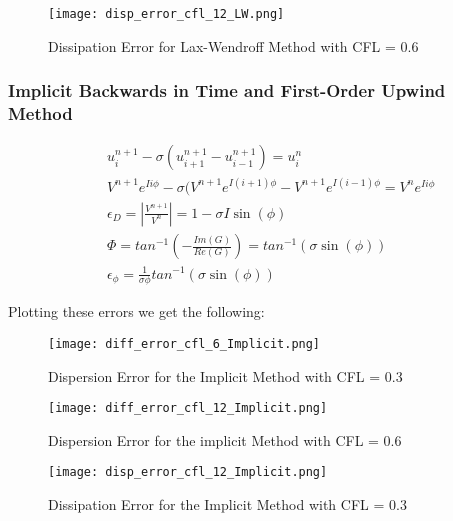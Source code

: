 \documentclass[a4paper,12pt,titlepage]{article}
\newcommand{\scale}{0.5}
\begin{document}
\begin{figure}[H]
  \begin{center}
    \texttt{[image: disp\_error\_cfl\_12\_LW.png]}
    \caption{Dissipation Error for Lax-Wendroff Method with CFL = 0.6}
  \end{center}
\end{figure}



\subsubsection{Implicit Backwards in Time and First-Order Upwind Method}
\begin{eqnarray}
&&u_{i}^{n+1} - \sigma(u_{i+1}^{n+1}-u_{i-1}^{n+1}) = u_i^n\nonumber \\
&&V^{n+1}e^{Ii\phi} - \sigma(V^{n+1}e^{I(i+1)\phi}-V^{n+1}e^{I(i-1)\phi} = V^{n}e^{Ii\phi}\nonumber \\
&&\boxed{\epsilon_D = \left|\frac{V^{n+1}}{V^n} \right| = 1-\sigma I \sin(\phi)}\nonumber \\
&&\Phi = tan^{-1}\left(-\frac{Im(G)}{Re(G)} \right) = tan^{-1}\left(\sigma \sin(\phi) \right)\nonumber \\
&&\boxed{\epsilon_\phi = \frac{1}{\sigma \phi}tan^{-1}\left(\sigma \sin(\phi) \right)}
\end{eqnarray}

Plotting these errors we get the following:

\begin{figure}[H]
  \begin{center}
    \texttt{[image: diff\_error\_cfl\_6\_Implicit.png]}
    \caption{Dispersion Error for the Implicit Method with CFL = 0.3}
  \end{center}
\end{figure}

\begin{figure}[H]
  \begin{center}
    \texttt{[image: diff\_error\_cfl\_12\_Implicit.png]}
    \caption{Dispersion Error for the implicit Method with CFL = 0.6}
  \end{center}
\end{figure}

\begin{figure}[H]
  \begin{center}
    \texttt{[image: disp\_error\_cfl\_12\_Implicit.png]}
    \caption{Dissipation Error for the Implicit Method with CFL = 0.3}
  \end{center}
\end{figure}
\end{document}
